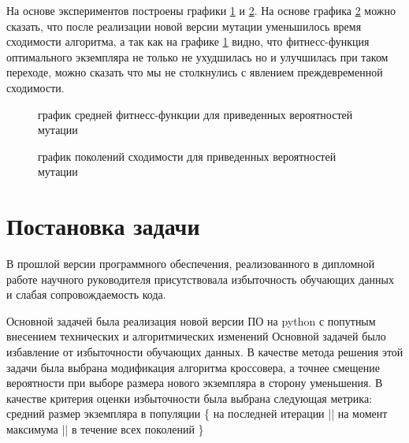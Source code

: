 \documentclass[utf8,usehyperref,12pt]{G7-32}
\begin{document}
На основе экспериментов построены графики \ref{mutate_diff_fit} и \ref{mutate_diff_gen}. На основе графика  \ref{mutate_diff_gen} можно сказать, что после реализации новой версии мутации уменьшилось время сходимости алгоритма, а так как на графике \ref{mutate_diff_fit} видно, что фитнесс-функция оптимального экземпляра не только не ухудшилась но и улучшилась при таком переходе, можно сказать что мы не столкнулись с явлением преждевременной сходимости.
\begin{figure}[H]
 \caption{график средней фитнесс-функции для приведенных вероятностей мутации}\label{mutate_diff_fit}
\end{figure}
\begin{figure}[H]
 \caption{график поколений сходимости для приведенных вероятностей мутации}\label{mutate_diff_gen}
\end{figure}



\chapter{Постановка задачи}
В прошлой версии программного обеспечения, реализованного в дипломной работе научного руководителя присутствовала избыточность обучающих данных и слабая сопровождаемость кода.

Основной задачей была реализация новой версии ПО на python с попутным внесением технических и алгоритмических изменений
Основной задачей было избавление от избыточности обучающих данных. В качестве метода решения этой задачи была выбрана модификация алгоритма кроссовера, а точнее смещение вероятности при выборе размера нового экземпляра в сторону уменьшения. В качестве критерия оценки избыточности была выбрана следующая метрика: средний размер экземпляра в популяции \{ на последней итерации || на момент максимума || в течение всех поколений \}
\end{document}
